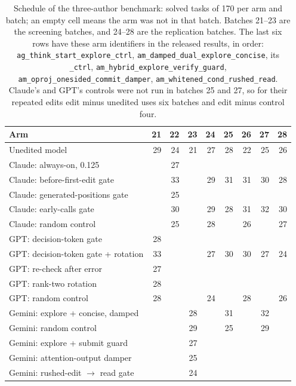 \begin{table}[h]
\caption{Schedule of the three-author benchmark: solved tasks of 170 per arm and batch; an empty cell means the arm was not in that batch. Batches 21--23 are the screening batches, and 24--28 are the replication batches. The last six rows have these arm identifiers in the released results, in order: \texttt{ag\_think\_start\_explore\_ctrl}, \texttt{am\_damped\_dual\_explore\_concise}, its \texttt{\_ctrl}, \texttt{am\_hybrid\_explore\_verify\_guard}, \texttt{am\_oproj\_onesided\_commit\_damper}, \texttt{am\_whitened\_cond\_rushed\_read}. Claude's and GPT's controls were not run in batches 25 and 27, so for their repeated edits edit minus unedited uses six batches and edit minus control four.}
\label{tab:arenaschedule}
\centering
\footnotesize
\begin{tabular}{lrrrrrrrr}
\toprule
Arm & 21 & 22 & 23 & 24 & 25 & 26 & 27 & 28 \\
\midrule
Unedited model & 29 & 24 & 21 & 27 & 28 & 22 & 25 & 26 \\
Claude: always-on, 0.125 &  & 27 &  &  &  &  &  &  \\
Claude: before-first-edit gate &  & 33 &  & 29 & 31 & 31 & 30 & 28 \\
Claude: generated-positions gate &  & 25 &  &  &  &  &  &  \\
Claude: early-calls gate &  & 30 &  & 29 & 28 & 31 & 32 & 30 \\
Claude: random control &  & 25 &  & 28 &  & 26 &  & 27 \\
GPT: decision-token gate & 28 &  &  &  &  &  &  &  \\
GPT: decision-token gate + rotation & 33 &  &  & 27 & 30 & 30 & 27 & 24 \\
GPT: re-check after error & 27 &  &  &  &  &  &  &  \\
GPT: rank-two rotation & 28 &  &  &  &  &  &  &  \\
GPT: random control & 28 &  &  & 24 &  & 28 &  & 26 \\
Gemini: explore + concise, damped &  &  & 28 &  & 31 &  & 32 &  \\
Gemini: random control &  &  & 29 &  & 25 &  & 29 &  \\
Gemini: explore + submit guard &  &  & 27 &  &  &  &  &  \\
Gemini: attention-output damper &  &  & 25 &  &  &  &  &  \\
Gemini: rushed-edit $\rightarrow$ read gate &  &  & 24 &  &  &  &  &  \\
\bottomrule
\end{tabular}
\end{table}
